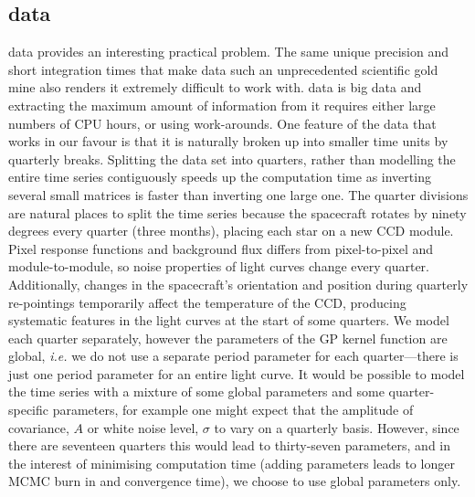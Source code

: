 \subsection{\kepler data}
\kepler data provides an interesting practical problem.
The same unique precision and short integration times that make \kepler
data such an unprecedented scientific gold mine also renders it extremely
difficult to work with.
\kepler data is big data and extracting the maximum amount of information
from it requires either large numbers of CPU hours, or using work-arounds.
One feature of the \kepler data that works in our favour is that it is
naturally broken up into smaller time units by quarterly breaks.
Splitting the data set into quarters, rather than modelling the entire time
series contiguously speeds up the computation time as inverting several
small matrices is faster than inverting one large one.
The \kepler quarter divisions are natural places to split the time series
because the spacecraft rotates by ninety degrees every quarter (three months),
placing each star on a new CCD module.
Pixel response functions and background flux differs from pixel-to-pixel and
module-to-module, so noise properties of \kepler light curves change every
quarter.
Additionally, changes in the spacecraft's orientation and position during
quarterly re-pointings temporarily affect the temperature of the CCD,
producing systematic features in the light curves at the start of some
quarters.
We model each quarter separately, however the parameters of the GP kernel
function are global, {\it i.e.} we do not use a separate period parameter for
each quarter---there is just one period parameter for an entire light curve.
It would be possible to model the time series with a mixture of some global
parameters and some quarter-specific parameters, for example one might expect
that the amplitude of covariance, $A$ or white noise level, $\sigma$ to vary
on a quarterly basis.
However, since there are seventeen quarters this would lead to thirty-seven
parameters, and in the interest of minimising computation time (adding
parameters leads to longer MCMC burn in and convergence time), we choose to
use global parameters only.

